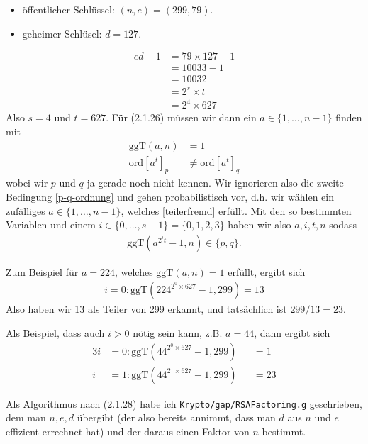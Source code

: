 \begin{itemize}
\item öffentlicher Schlüssel: $(n, e) = (299, 79)$.
\item geheimer Schlüsel: $d = 127$.
\end{itemize}
\begin{align*}
ed - 1 &= 79\times127 - 1 \\
&= 10033 - 1 \\
&= 10032 \\
&= 2^{s}\times t \\
&= 2^{4}\times 627
\end{align*}
Also $s = 4$ und $t = 627$. Für (2.1.26) müssen wir dann ein $a \in \{1,\dots,n-1\}$ finden mit
\begin{subequations}
\begin{align}
\mathrm{ggT}(a, n) &=\label{teilerfremd} 1 \\
\mathrm{ord}[a^{t}]_{p} &\neq\label{p-q-ordnung} \mathrm{ord}[a^{t}]_{q}
\end{align}
\end{subequations}
wobei wir $p$ und $q$ ja gerade noch nicht kennen. Wir ignorieren also die zweite Bedingung \eqref{p-q-ordnung} und gehen probabilistisch vor,
d.h. wir wählen ein zufälliges $a \in \{1,\dots,n-1\}$, welches \eqref{teilerfremd} erfüllt.
Mit den so bestimmten Variablen und einem $i \in \{0,\dots,s-1\} = \{0,1,2,3\}$
haben wir also $a, i, t, n$ sodass
\begin{align}
\mathrm{ggT}(a^{2^{i}t} - 1, n) \in \{p,q\}.
\end{align}

Zum Beispiel für $a = 224$, welches $\mathrm{ggT}(a,n) = 1$ erfüllt, ergibt sich
\begin{align*}
i = 0: \mathrm{ggT}(224^{2^{0}\times627} - 1, 299 ) = 13
\end{align*}
Also haben wir 13 als Teiler von 299 erkannt, und tatsächlich ist $299 / 13 = 23$.

Als Beispiel, dass auch $i > 0$ nötig sein kann, z.B. $a = 44$, dann ergibt sich
\begin{alignat*}{3}
i &= 0: \mathrm{ggT}(44^{2^{0}\times627} - 1, 299 ) &&= 1 \\
i &= 1: \mathrm{ggT}(44^{2^{1}\times627} - 1, 299 ) &&= 23
\end{alignat*}

Als Algorithmus nach (2.1.28) habe ich \texttt{Krypto/gap/RSAFactoring.g} geschrieben, dem man $n, e, d$ übergibt (der also bereits annimmt, dass man
$d$ aus $n$ und $e$ effizient errechnet hat) und der daraus einen Faktor von $n$ bestimmt.